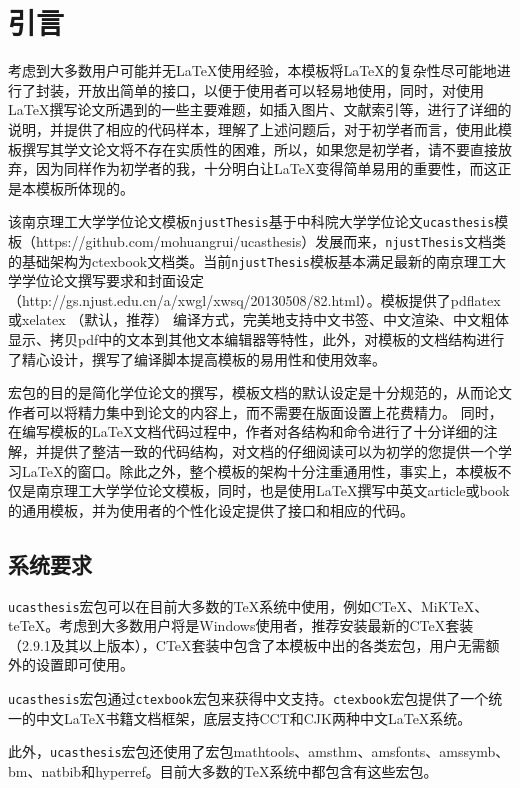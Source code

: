
\chapter{引言}
\label{chap:introduction}

考虑到大多数用户可能并无\LaTeX{}使用经验，本模板将\LaTeX{}的复杂性尽可能地进行了封装，开放出简单的接口，以便于使用者可以轻易地使用，同时，对使用\LaTeX{}撰写论文所遇到的一些主要难题，如插入图片、文献索引等，进行了详细的说明，并提供了相应的代码样本，理解了上述问题后，对于初学者而言，使用此模板撰写其学文论文将不存在实质性的困难，所以，如果您是初学者，请不要直接放弃，因为同样作为初学者的我，十分明白让\LaTeX{}变得简单易用的重要性，而这正是本模板所体现的。

该南京理工大学学位论文模板\texttt{njustThesis}基于中科院大学学位论文\texttt{ucasthesis}模板（https://github.com/mohuangrui/ucasthesis）发展而来，\texttt{njustThesis}文档类的基础架构为ctexbook文档类。当前\texttt{njustThesis}模板基本满足最新的南京理工大学学位论文撰写要求和封面设定（http://gs.njust.edu.cn/a/xwgl/xwsq/20130508/82.html）。模板提供了pdflatex 或xelatex （默认，推荐） 编译方式，完美地支持中文书签、中文渲染、中文粗体显示、拷贝pdf中的文本到其他文本编辑器等特性，此外，对模板的文档结构进行了精心设计，撰写了编译脚本提高模板的易用性和使用效率。

宏包的目的是简化学位论文的撰写，模板文档的默认设定是十分规范的，从而论文作者可以将精力集中到论文的内容上，而不需要在版面设置上花费精力。 同时，在编写模板的\LaTeX{}文档代码过程中，作者对各结构和命令进行了十分详细的注解，并提供了整洁一致的代码结构，对文档的仔细阅读可以为初学的您提供一个学习\LaTeX{}的窗口。除此之外，整个模板的架构十分注重通用性，事实上，本模板不仅是南京理工大学学位论文模板，同时，也是使用\LaTeX{}撰写中英文article或book的通用模板，并为使用者的个性化设定提供了接口和相应的代码。

\section{系统要求}

\texttt{ucasthesis}宏包可以在目前大多数的\TeX{}系统中使用，例如C\TeX{}、MiK\TeX{}、te\TeX{}。考虑到大多数用户将是Windows使用者，推荐安装最新的C\TeX{}套装（2.9.1及其以上版本），C\TeX{}套装中包含了本模板中出的各类宏包，用户无需额外的设置即可使用。

\texttt{ucasthesis}宏包通过\texttt{ctexbook}宏包来获得中文支持。\texttt{ctexbook}宏包提供了一个统一的中文\LaTeX{}书籍文档框架，底层支持CCT和CJK两种中文\LaTeX{}系统。

此外，\texttt{ucasthesis}宏包还使用了宏包mathtools、amsthm、amsfonts、amssymb、bm、natbib和hyperref。目前大多数的\TeX{}系统中都包含有这些宏包。


